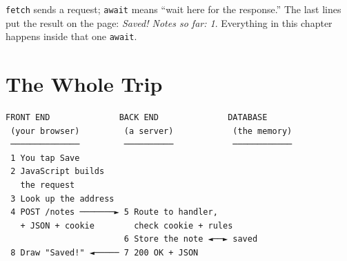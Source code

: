 \texttt{fetch} sends a request; \texttt{await} means ``wait here for the response.'' The last lines put the result on the page: \emph{Saved! Notes so far: 1}. Everything in this chapter happens inside that one \texttt{await}.

\section{The Whole Trip}\label{04-following-one-tap:the-whole-trip}

\begin{codeblock}
\begin{Verbatim}[breaklines=false, fontsize=\fontsize{8.8}{8.68}\selectfont, fontfamily=diagrammono, formatcom=\diagramlines]
 FRONT END              BACK END              DATABASE
 (your browser)         (a server)            (the memory)
 ──────────────         ──────────            ────────────
 1 You tap Save
 2 JavaScript builds
   the request
 3 Look up the address
 4 POST /notes ───────► 5 Route to handler,
   + JSON + cookie        check cookie + rules
                        6 Store the note ◄──► saved
 8 Draw "Saved!" ◄───── 7 200 OK + JSON
\end{Verbatim}
\end{codeblock}

